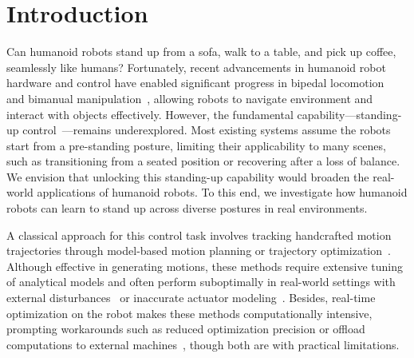 \section{Introduction}
Can humanoid robots stand up from a sofa, walk to a table, and pick up coffee, seamlessly like humans?
Fortunately, recent advancements in humanoid robot hardware and control have enabled significant progress in bipedal locomotion~\cite{radosavovic2024real,li2024reinforcement,long2024learning,zhuang2024humanoid} and bimanual manipulation~\cite{Cheng2024OpenTeleVisionTW,Li2024OKAMITH,Fu2024HumanPlusHS,Jiang2024HarmonWM}, allowing robots to navigate environment and interact with objects effectively. However, the fundamental capability—standing-up control~\cite{stuckler2006getting,kanehiro2003first}—remains underexplored. Most existing systems assume the robots start from a pre-standing posture, limiting their applicability to many scenes, such as transitioning from a seated position or recovering after a loss of balance. We envision that unlocking this standing-up capability would broaden the real-world applications of humanoid robots. To this end, we investigate how humanoid robots can learn to stand up across diverse postures in real environments.

A classical approach for this control task involves tracking handcrafted motion trajectories through model-based motion planning or trajectory optimization~\cite{kanehiro2003first,kanehiro2007getting,kuniyoshi2004dynamic,stuckler2006getting}. 
Although effective in generating motions, these methods require extensive tuning of analytical models and often perform suboptimally in real-world settings with external disturbances~\cite{luo2014multi,lee2019robust} or inaccurate actuator modeling~\cite{hwangbo2019learning}. Besides, real-time optimization on the robot makes these methods computationally intensive, prompting workarounds such as reduced optimization precision or offload computations to external machines~\cite{neunert2017trajectory,farshidian2017efficient}, though both are with practical limitations.

